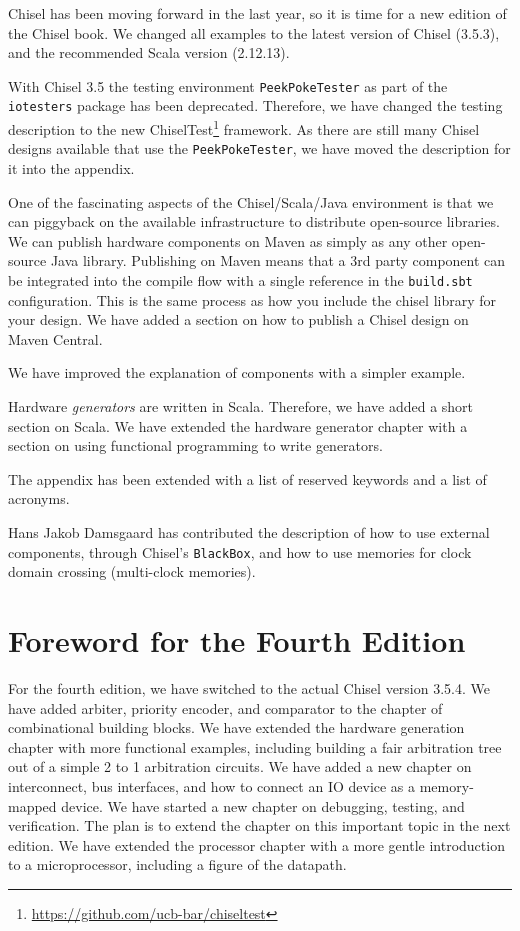 \documentclass[%
    10pt,
    headinclude, footexclude,
    openright, %
    notitlepage,
    cleardoubleempty,
    headsepline,
    pointlessnumbers,
    bibtotoc, idxtotoc,
    ]{scrbook}
\newcommand{\code}[1]{{\lstinline[basicstyle=\small\ttfamily]{#1}}}
\newcommand{\myref}[2]{\href{#1}{#2}}
\renewcommand{\myref}[2]{{#2}{\footnote{\url{#1}}}}
\begin{document}
Chisel has been moving forward in the last year, so it is time for a new edition of the Chisel book.
We changed all examples to the latest version of Chisel (3.5.3), and the recommended
Scala version (2.12.13).

With Chisel 3.5 the testing environment \code{PeekPokeTester} as part of the \code{iotesters}
package has been deprecated. Therefore, we have changed the testing description to the new
\myref{https://github.com/ucb-bar/chiseltest}{ChiselTest} framework.
As there are still many Chisel designs available that use the \code{PeekPokeTester},
we have moved the description for it into the appendix.

One of the fascinating aspects of the Chisel/Scala/Java environment is that we
can piggyback on the available infrastructure to distribute open-source libraries.
We can publish hardware components on Maven as simply as any other open-source Java library.
Publishing on Maven means that a 3rd party component can be integrated into the
compile flow with a single reference in the \code{build.sbt} configuration.
This is the same process as how you include the chisel library for your design.
We have added a section on how to publish a Chisel design on Maven Central.

We have improved the explanation of components with a simpler example.

Hardware \emph{generators} are written in Scala. Therefore, we have added a short
section on Scala. We have extended the hardware generator chapter with a section
on using functional programming to write generators.

The appendix has been extended with a list of reserved keywords and a list
of acronyms.

Hans Jakob Damsgaard has contributed the description of how to use external components, through Chisel's \code{BlackBox}, and how to use memories for clock domain crossing
(multi-clock memories).

\section*{Foreword for the Fourth Edition}

For the fourth edition, we have switched to the actual Chisel version 3.5.4.
We have added arbiter, priority encoder, and comparator to the chapter of
combinational building blocks.
We have extended the hardware generation chapter with more functional
examples, including building a fair arbitration tree out of a simple 2 to 1
arbitration circuits.
We have added a new chapter on interconnect, bus interfaces,
and how to connect an IO device as a memory-mapped device.
We have started a new chapter on debugging, testing, and verification.
The plan is to extend the chapter on this important topic in the next edition.
We have extended the processor chapter with a more gentle introduction
to a microprocessor, including a figure of the datapath.
\end{document}
